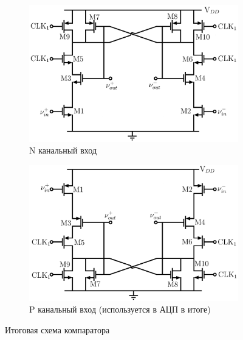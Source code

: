 \documentclass[a4paper,12pt]{article} %
\begin{document}
\begin{figure}[H]
    \begin{subfigure}[b]{0.5\textwidth}
      \includegraphics[width=\textwidth]{comparator_N}
      \caption{ N канальный вход }
      \label{pic:comparator_N}
    \end{subfigure}
    \begin{subfigure}[b]{0.5\textwidth}
      \includegraphics[width=\textwidth]{comparator}
      \caption{ P канальный вход (используется в АЦП в итоге) }
      \label{pic:comparator}
    \end{subfigure}
    \caption{Итоговая схема компаратора}
  \end{figure}
\end{document}

